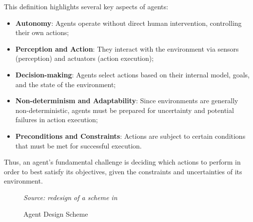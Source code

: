 This definition highlights several key aspects of agents:
\begin{itemize}
  \item \textbf{Autonomy}: Agents operate without direct human intervention,
    controlling their own actions;

  \item \textbf{Perception and Action}: They interact with the environment via sensors
    (perception) and actuators (action execution);

  \item \textbf{Decision-making}: Agents select actions based on their internal model,
    goals, and the state of the environment;

  \item \textbf{Non-determinism and Adaptability}: Since environments are generally
    non-deterministic, agents must be prepared for uncertainty and potential
    failures in action execution;

  \item \textbf{Preconditions and Constraints}: Actions are subject to certain conditions
    that must be met for successful execution.
\end{itemize}

Thus, an agent's fundamental challenge is deciding which actions to perform in order
to best satisfy its objectives, given the constraints and uncertainties of its
environment.

\vspace{1cm} %
\begin{figure}[ht!]
  \centering
  \caption{Agent Design Scheme}
  {\emph{Source: redesign of a scheme in \cite{wooldridge2002multiagent}}} \label{fig:agent_scheme}
\end{figure}
\vspace{1cm} %

